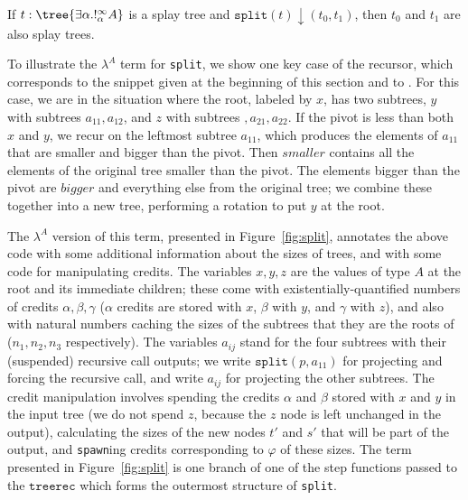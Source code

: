 \begin{lemma} \label{lem:splay-tree-invariant}
If $t : \tree {\exists \alpha. !^\infty_\alpha A}$ is a splay tree and $\texttt{split}(t) \downarrow (t_0,t_1)$, then $t_0$ and $t_1$ are also splay trees.
\end{lemma}

To illustrate the $\lambda^A$ term for \texttt{split}, we show one key
case of the recursor, which corresponds to the snippet given at the
beginning of this section and to \cite[Theorem
  5.2]{okasaki:purely-functional-data-structures}.  For this case, we
are in the situation where the root, labeled by $x$, has two subtrees,
$y$ with subtrees $a_{11},a_{12}$, and $z$ with subtrees
$,a_{21},a_{22}$. If the pivot is less than both $x$ and $y$, we recur
on the leftmost subtree $a_{11}$, which produces the elements of
$a_{11}$ that are smaller and bigger than the pivot.  Then $smaller$
contains all the elements of the original tree smaller than the pivot.
The elements bigger than the pivot are $bigger$ and everything else from
the original tree; we combine these together into a new tree, performing
a rotation to put $y$ at the root.

The $\lambda^A$ version of this term, presented in Figure~\ref{fig:split}, annotates the above code with some additional information about the sizes of trees, and with some code for manipulating credits.  The variables $x,y,z$ are the values of type $A$ at the root and its immediate children; these come with existentially-quantified numbers of credits $\alpha,\beta,\gamma$ ($\alpha$ credits are stored with $x$, $\beta$ with $y$, and $\gamma$ with $z$), and also with natural numbers caching the sizes of the subtrees that they are the roots of ($n_1,n_2,n_3$ respectively).
The variables $a_{ij}$ stand for the four subtrees with their (suspended) recursive call outputs; we write $\texttt{split}(p,a_{11})$ for projecting and forcing the recursive call, and write $a_{ij}$ for projecting the other subtrees.  The credit manipulation involves spending the credits $\alpha$ and $\beta$ stored with $x$ and $y$ in the input tree (we do not spend $z$, because the $z$ node is left unchanged in the output), calculating the sizes of the new nodes $t'$ and $s'$ that will be part of the output, and \texttt{spawn}ing credits corresponding to $\varphi$ of these sizes. The term presented in Figure~\ref{fig:split} is one branch of one of the step functions passed to the $\texttt{treerec}$ which forms the outermost structure of \texttt{split}.

